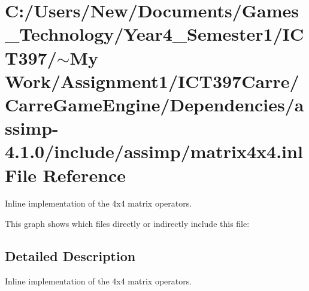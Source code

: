 \hypertarget{matrix4x4_8inl}{
\section{C:/Users/New/Documents/Games\_\-Technology/Year4\_\-Semester1/ICT397/$\sim$My Work/Assignment1/ICT397Carre/CarreGameEngine/Dependencies/assimp-4.1.0/include/assimp/matrix4x4.inl File Reference}
\label{matrix4x4_8inl}
}
Inline implementation of the 4x4 matrix operators. 



This graph shows which files directly or indirectly include this file:

\subsection{Detailed Description}
Inline implementation of the 4x4 matrix operators. 

